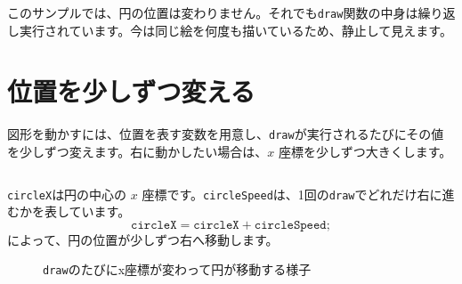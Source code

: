 このサンプルでは、円の位置は変わりません。それでも\texttt{draw}関数の中身は繰り返し実行されています。今は同じ絵を何度も描いているため、静止して見えます。

\section{位置を少しずつ変える}

図形を動かすには、位置を表す変数を用意し、\texttt{draw}が実行されるたびにその値を少しずつ変えます。右に動かしたい場合は、$x$ 座標を少しずつ大きくします。

\begin{listing}[htbp]
\inputminted{ts}{typescript-p5/listings/chapter05/moving-circle.ts}
\caption{x座標を変えて円を動かす（\texttt{chapter05/moving-circle.ts}）}
\label{lst:chapter05-moving-circle}
\end{listing}

\texttt{circleX}は円の中心の $x$ 座標です。\texttt{circleSpeed}は、1回の\texttt{draw}でどれだけ右に進むかを表しています。
\[
\texttt{circleX} = \texttt{circleX} + \texttt{circleSpeed};
\]
によって、円の位置が少しずつ右へ移動します。

\begin{figure}[htbp]
    \centering
    \caption{\texttt{draw}のたびにx座標が変わって円が移動する様子}
    \label{fig:chapter05-circle-frame-sequence}
\end{figure}

